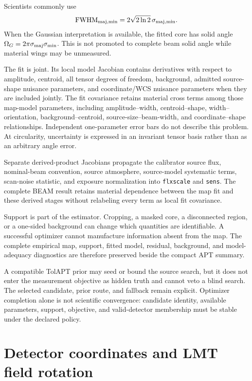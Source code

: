 \documentclass[11pt]{article}
\begin{document}
Scientists commonly use
\begin{equation}
{\rm FWHM}_{\rm maj,min}=2\sqrt{2\ln2}\,\sigma_{\rm maj,min}.
\label{eq:rationale-fwhm}
\end{equation}
When the Gaussian interpretation is available, the fitted core has solid
angle $\Omega_G=2\pi\sigma_{\rm maj}\sigma_{\rm min}$. This is not promoted
to complete beam solid angle while material wings may be unmeasured.

The fit is joint. Its local model Jacobian contains derivatives with respect
to amplitude, centroid, all tensor degrees of freedom, background, admitted
source-shape nuisance parameters, and coordinate/WCS nuisance parameters when
they are included jointly. The fit covariance retains material cross terms
among those map-model parameters, including amplitude--width,
centroid--shape, width--orientation, background--centroid,
source-size--beam-width, and coordinate--shape relationships. Independent
one-parameter error bars do not describe this problem. At circularity,
uncertainty is expressed in an invariant tensor basis rather than as an
arbitrary angle error.

Separate derived-product Jacobians propagate the calibrator source flux,
nominal-beam convention, source atmosphere, source-model systematic terms,
scan-noise statistic, and exposure normalization into \texttt{flxscale} and
\texttt{sens}. The complete BEAM result retains material dependence between
the map fit and these derived stages without relabeling every term as local
fit covariance.

Support is part of the estimator. Cropping, a masked core, a disconnected
region, or a one-sided background can change which quantities are identifiable.
A successful optimizer cannot manufacture information absent from the map.
The complete empirical map, support, fitted model, residual, background, and
model-adequacy diagnostics are therefore preserved beside the compact APT
summary.

A compatible TolAPT prior may seed or bound the source search, but it does not
enter the measurement objective as hidden truth and cannot veto a blind
search. The selected candidate, prior route, and fallback remain explicit.
Optimizer completion alone is not scientific convergence: candidate identity,
available parameters, support, objective, and valid-detector membership must
be stable under the declared policy.

\section{Detector coordinates and LMT field rotation}
\label{sec:geometry}
\end{document}
